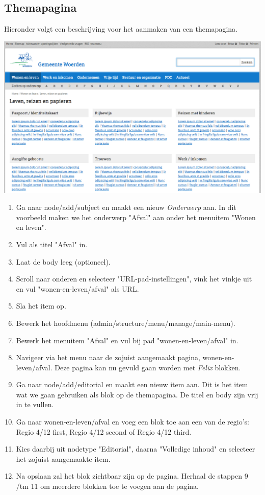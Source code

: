 \subsection{Themapagina}\label{themapagina}

Hieronder volgt een beschrijving voor het aanmaken van een themapagina.

\begin{center}
	\includegraphics[width=\textwidth]{img/themapagina.png}
\end{center}

\begin{enumerate}
\item Ga naar node/add/subject en maakt een nieuw \emph{Onderwerp} aan. In dit voorbeeld maken we het onderwerp "Afval" aan onder het menuitem "Wonen en leven".
\item Vul als titel "Afval" in.
\item Laat de body leeg (optioneel).
\item Scroll naar onderen en selecteer "URL-pad-instellingen", vink het vinkje uit en vul "wonen-en-leven/afval" als URL.
\item Sla het item op.
\item Bewerk het hoofdmenu (admin/structure/menu/manage/main-menu).
\item Bewerk het menuitem "Afval" en vul bij pad "wonen-en-leven/afval" in.
\item Navigeer via het menu naar de zojuist aangemaakt pagina, wonen-en-leven/afval. Deze pagina kan nu gevuld gaan worden met \emph{Felix} blokken.
\item Ga naar node/add/editorial en maakt een nieuw item aan. Dit is het item wat we gaan gebruiken als blok op de themapagina. De titel en body zijn vrij in te vullen.
\item Ga naar wonen-en-leven/afval en voeg een blok toe aan een van de regio's: Regio 4/12 first, Regio 4/12 second of Regio 4/12 third.
\item Kies daarbij uit nodetype "Editorial", daarna "Volledige inhoud" en selecteer het zojuist aangemaakte item.
\item Na opslaan zal het blok zichtbaar zijn op de pagina. Herhaal de stappen 9 /tm 11 om meerdere blokken toe te voegen aan de pagina.
\end{enumerate}